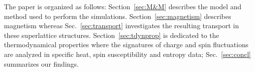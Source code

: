 \documentclass[aps,pra,reprint,twocolumn,showpacs,longbibliography,superscriptaddress]{revtex4-1}
\newcommand*{\rubem}{\textcolor{blue}} %
\begin{document}
The paper is organized as follows: Section~\ref{sec:M&M} describes the model and method used to perform the simulations. Section~\ref{sec:magnetism} describes magnetism whereas Sec.~\ref{sec:transport} investigates the resulting transport in these superlattice structures. Section~\ref{sec:tdynprop} is dedicated to the thermodynamical properties where the signatures of charge and spin fluctuations are analyzed in specific heat, spin susceptibility and entropy data; Sec.~\ref{sec:concl} summarizes our findings.

% 
% 
\end{document}
